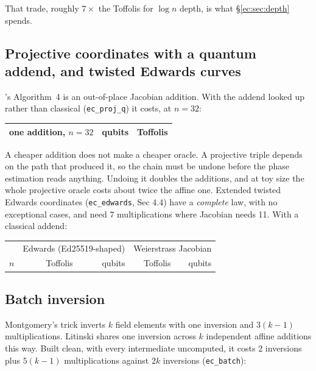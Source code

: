 \noindent That trade, roughly $7\times$ the Toffolis for $\log n$ depth, is what
\S\ref{ec:sec:depth} spends.

\subsection{Projective coordinates with a quantum addend, and twisted Edwards curves}

\cite{ec:kim26}'s Algorithm~4 is an out-of-place Jacobian addition. With the addend looked up rather
than classical (\texttt{ec\_proj\_q}) it costs, at $n=32$:

\begin{center}\small
\begin{tabular}{lrr}
\toprule
one addition, $n=32$ & qubits & Toffolis\\
\midrule
\bottomrule
\end{tabular}
\end{center}

\noindent A cheaper addition does not make a cheaper oracle. A projective triple depends on the path
that produced it, so the chain must be undone before the phase estimation reads anything. Undoing
it doubles the additions, and at toy size the whole projective oracle costs about twice the affine
one. Extended twisted Edwards coordinates (\texttt{ec\_edwards}, \cite{ec:kim26} Sec 4.4) have a
\emph{complete} law, with no exceptional cases, and need 7 multiplications where Jacobian needs 11.
With a classical addend:

\begin{center}\small
\begin{tabular}{rrrrr}
\toprule
& \multicolumn{2}{c}{Edwards (Ed25519-shaped)} & \multicolumn{2}{c}{Weierstrass Jacobian}\\
$n$ & Toffolis & qubits & Toffolis & qubits\\
\midrule
\bottomrule
\end{tabular}
\end{center}

\subsection{Batch inversion}

Montgomery's trick inverts $k$ field elements with one inversion and $3(k-1)$ multiplications.
Litinski \cite{ec:litinski23} shares one inversion across $k$ independent affine additions this
way. Built clean, with every intermediate uncomputed, it costs 2 inversions plus $5(k-1)$
multiplications against $2k$ inversions (\texttt{ec\_batch}):

